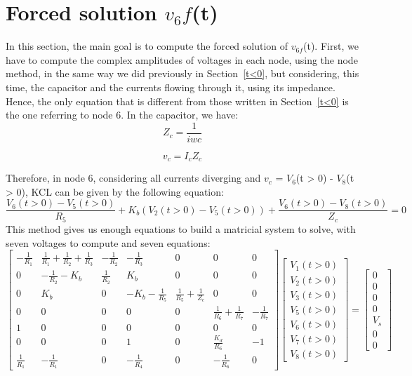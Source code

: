 \section{Forced solution $v_6f$(t)}
In this section, the main goal is to compute the forced solution of $v_{6f}$(t). First, we have to compute the complex amplitudes of voltages in each node, using the node method, in the same way we did previously in Section~\ref{t<0}, but considering, this time, the capacitor and the currents flowing through it, using its impedance. 
Hence, the only equation that is different from those written in Section~\ref{t<0} is the one referring to node 6. In the capacitor, we have:
\begin{equation}
Z_c = \frac{1}{iwc}
\label{eq:impedance}
\end{equation}

\begin{equation}
v_c = I_cZ_c
\label{eq:capacitor}
\end{equation}

\noindent Therefore, in node 6, considering all currents diverging and $v_c$ = $V_6$(t > 0) - $V_8$(t > 0), KCL can be given by the following equation:
\begin{equation}
\frac{V_6(t>0) - V_5(t>0)}{R_5} + K_b(V_2(t>0) - V_5(t>0)) + \frac{V_6(t>0) - V_8(t>0)}{Z_c}= 0
  \label{eq:node6}
\end{equation}
This method gives us enough equations to build a matricial system to solve, with seven voltages to compute and seven equations:
$$ \left[ \begin{array}{ccccccc} -\frac{1}{R_1} & \frac{1}{R_1} + \frac{1}{R_2} + \frac{1}{R_3} & -\frac{1}{R_2} & -\frac{1}{R_3} & 0 & 0 & 0 \\
0 & -\frac{1}{R_2} - K_b & \frac{1}{R_2} & K_b & 0 & 0 & 0 \\
0 & K_b & 0 & -K_b -\frac{1}{R_5}& \frac{1}{R_5} + \frac{1}{Z_c} & 0 & 0
\\ 0 & 0 & 0 & 0 & 0 & \frac{1}{R_6} + \frac{1}{R_7} & -\frac{1}{R_7}
\\ 1 & 0 & 0 & 0 & 0 & 0 & 0
\\ 0 & 0 & 0 & 1 & 0 & \frac{K_d}{R_6} & -1
\\ \frac{1}{R_1} & -\frac{1}{R_1} & 0 & -\frac{1}{R_4} & 0 & -\frac{1}{R_6} & 0\end{array} \right]
\left[ \begin{array}{c} V_1(t>0) \\ V_2(t>0) \\ V_3(t>0) \\ V_5(t>0) \\ V_6(t>0) \\ V_7(t>0) \\ V_8(t>0)\end{array} \right] = 
\left[ \begin{array}{c} 0 \\ 0 \\ 0 \\ 0 \\ V_s \\ 0 \\ 0\end{array} \right] $$


